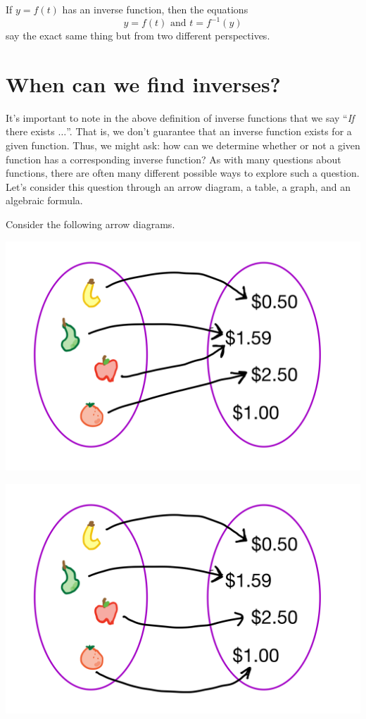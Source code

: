 \documentclass[nooutcomes]{ximera}
\begin{document}
If $y = f(t)$ has an inverse function, then the equations
$$
y = f(t) \text{ and } t = f^{-1}(y)
$$
say the exact same thing but from two different perspectives. 


\section{When can we find inverses?}
 It's important to note in the above definition of inverse functions that we say ``\emph{If} there exists $\ldots$''.  That is, we don't guarantee that an inverse function exists for a given function.  Thus, we might ask: how can we determine whether or not a given function has a corresponding inverse function?  As with many questions about functions, there are often many different possible ways to explore such a question. Let's consider this question through an arrow diagram, a table, a graph, and an algebraic formula.
 

Consider the following arrow diagrams.

\begin{image}
    \includegraphics{arrow.1.png}
\end{image}

\begin{image}
    \includegraphics{arrow.2.png}
\end{image}
\end{document}
